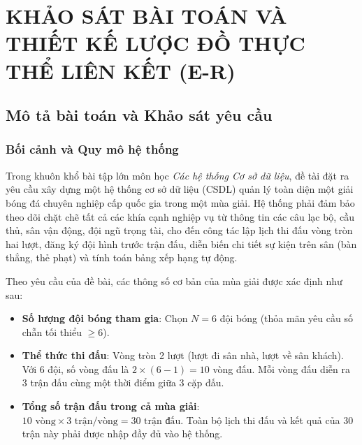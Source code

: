 \chapter{KHẢO SÁT BÀI TOÁN VÀ THIẾT KẾ LƯỢC ĐỒ THỰC THỂ LIÊN KẾT (E-R)}

\section{Mô tả bài toán và Khảo sát yêu cầu}

\subsection{Bối cảnh và Quy mô hệ thống}
Trong khuôn khổ bài tập lớn môn học \textit{Các hệ thống Cơ sở dữ liệu}, đề tài đặt ra yêu cầu xây dựng một hệ thống cơ sở dữ liệu (CSDL) quản lý toàn diện một giải bóng đá chuyên nghiệp cấp quốc gia trong một mùa giải. Hệ thống phải đảm bảo theo dõi chặt chẽ tất cả các khía cạnh nghiệp vụ từ thông tin các câu lạc bộ, cầu thủ, sân vận động, đội ngũ trọng tài, cho đến công tác lập lịch thi đấu vòng tròn hai lượt, đăng ký đội hình trước trận đấu, diễn biến chi tiết sự kiện trên sân (bàn thắng, thẻ phạt) và tính toán bảng xếp hạng tự động.

Theo yêu cầu của đề bài, các thông số cơ bản của mùa giải được xác định như sau:
\begin{itemize}
    \item \textbf{Số lượng đội bóng tham gia}: Chọn $N = 6$ đội bóng (thỏa mãn yêu cầu số chẵn tối thiểu $\ge 6$).
    \item \textbf{Thể thức thi đấu}: Vòng tròn 2 lượt (lượt đi sân nhà, lượt về sân khách). Với 6 đội, số vòng đấu là $2 \times (6 - 1) = 10$ vòng đấu. Mỗi vòng đấu diễn ra 3 trận đấu cùng một thời điểm giữa 3 cặp đấu.
    \item \textbf{Tổng số trận đấu trong cả mùa giải}: $10 \text{ vòng} \times 3 \text{ trận/vòng} = 30 \text{ trận đấu}$. Toàn bộ lịch thi đấu và kết quả của 30 trận này phải được nhập đầy đủ vào hệ thống.
\end{itemize}

